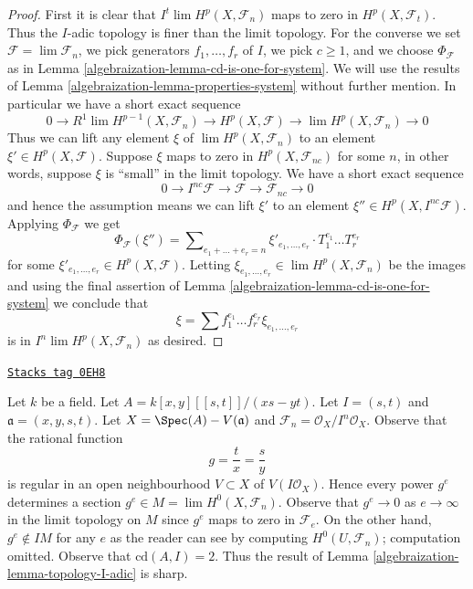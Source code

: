 \begin{proof}

First it is clear that $I^t \lim H^p(X, \mathcal{F}_n)$
maps to zero in $H^p(X, \mathcal{F}_t)$. Thus the $I$-adic topology
is finer than the limit topology. For the converse we set
$\mathcal{F} = \lim \mathcal{F}_n$, we pick generators $f_1, \ldots, f_r$
of $I$, we pick $c \geq 1$, and we choose
$\Phi_\mathcal{F}$ as in Lemma \ref{algebraization-lemma-cd-is-one-for-system}.
We will use the results of Lemma \ref{algebraization-lemma-properties-system}
without further mention. In particular we have a short exact
sequence
$$
0 \to R^1\lim H^{p - 1}(X, \mathcal{F}_n) \to H^p(X, \mathcal{F})
\to \lim H^p(X, \mathcal{F}_n) \to 0
$$
Thus we can lift any element $\xi$ of $\lim H^p(X, \mathcal{F}_n)$
to an element $\xi' \in H^p(X, \mathcal{F})$. Suppose $\xi$ maps to zero
in $H^p(X, \mathcal{F}_{nc})$ for some $n$, in other
words, suppose $\xi$ is ``small'' in the limit topology. We have a
short exact sequence
$$
0 \to I^{nc}\mathcal{F} \to \mathcal{F} \to \mathcal{F}_{nc} \to 0
$$
and hence the assumption means we can lift $\xi'$ to an element
$\xi'' \in H^p(X, I^{nc}\mathcal{F})$. Applying $\Phi_\mathcal{F}$
we get
$$
\Phi_\mathcal{F}(\xi'') = \sum\nolimits_{e_1 + \ldots + e_r = n}
\xi'_{e_1, \ldots, e_r} \cdot T_1^{e_1} \ldots T_r^{e_r}
$$
for some $\xi'_{e_1, \ldots, e_r} \in H^p(X, \mathcal{F})$.
Letting $\xi_{e_1, \ldots, e_r} \in \lim H^p(X, \mathcal{F}_n)$
be the images and using the final assertion of
Lemma \ref{algebraization-lemma-cd-is-one-for-system}
we conclude that
$$
\xi = \sum f_1^{e_1} \ldots f_r^{e_r} \xi_{e_1, \ldots, e_r}
$$
is in $I^n \lim H^p(X, \mathcal{F}_n)$ as desired.
\end{proof}

\begin{example}
\label{algebraization-example-not-I-adic}
\href{https://stacks.math.columbia.edu/tag/0EH8}{\texttt{Stacks tag 0EH8}}

Let $k$ be a field. Let $A = k[x, y][[s, t]]/(xs - yt)$.
Let $I = (s, t)$ and $\mathfrak a = (x, y, s, t)$.
Let $X = \Spec(A) - V(\mathfrak a)$ and
$\mathcal{F}_n = \mathcal{O}_X/I^n\mathcal{O}_X$.
Observe that the rational function
$$
g = \frac{t}{x} = \frac{s}{y}
$$
is regular in an open neighbourhood $V \subset X$ of
$V(I\mathcal{O}_X)$. Hence every power $g^e$ determines a section
$g^e \in M = \lim H^0(X, \mathcal{F}_n)$. Observe that
$g^e \to 0$ as $e \to \infty$ in the limit topology on $M$
since $g^e$ maps to zero in $\mathcal{F}_e$.
On the other hand, $g^e \not \in IM$ for any $e$
as the reader can see by computing $H^0(U, \mathcal{F}_n)$;
computation omitted. Observe that $\text{cd}(A, I) = 2$.
Thus the result of Lemma \ref{algebraization-lemma-topology-I-adic} is sharp.
\end{example}

